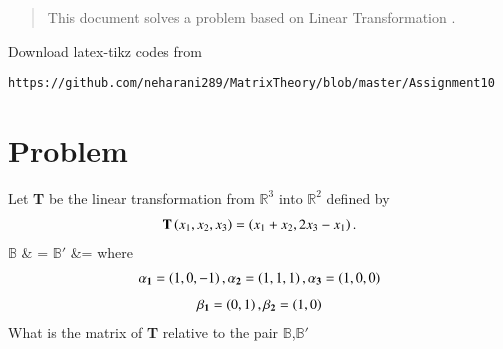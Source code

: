 \documentclass[journal,12pt,twocolumn]{IEEEtran}
\begin{document}
	
	\maketitle
	\newpage
	\bigskip
	\renewcommand{\thefigure}{\theenumi}
	\renewcommand{\thetable}{\theenumi}
	\date{Today}
\begin{abstract}
This document solves a problem based on Linear Transformation .
\end{abstract}
%
Download latex-tikz codes from 
%
\begin{lstlisting}
https://github.com/neharani289/MatrixTheory/blob/master/Assignment10
\end{lstlisting}
\section{\textbf{Problem}}
Let \textbf{T} be the linear transformation from  $\mathbb{R}^3$ into $\mathbb{R}^2$ defined by
\begin{align}
 \textbf{T} \left(x_1, x_2,x_3\right) = \left(x_1+x_2,2x_3-x_1\right). 
 \end{align}
 $\mathbb{B}$ & =  
 $\mathbb{B}'$ &= 
where 
\begin{align}
\mathbf{\alpha_1}  = \left(1,0,-1\right),  \mathbf{\alpha_2} = \left(1,1,1\right), \mathbf{\alpha_3} = \left(1,0,0\right)\nonumber\end{align}
\begin{align}
\mathbf{\beta_1} = \left(0,1\right), \mathbf{\beta_2} = \left(1,0\right)\nonumber
\end{align}
What is the matrix of \textbf{T} relative to the pair $\mathbb{B}$,$\mathbb{B'}$
\end{document}

